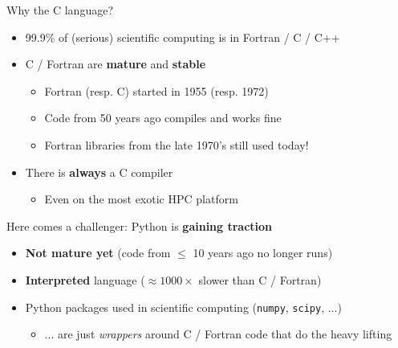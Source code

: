 \documentclass[10pt]{beamer}
\begin{document}
\begin{frame}
  \begin{block}{Why the C language?}
  \begin{itemize}
  \item 99.9\% of (serious) scientific computing is in Fortran / C / C++

    \medskip

  \item C / Fortran are \textbf{mature} and \textbf{stable}
    \begin{itemize}
    \item Fortran (resp. C) started in 1955 (resp. 1972)
    \item Code from 50 years ago compiles and works fine
    \item Fortran libraries from the late 1970's still used today!
    \end{itemize}

    \medskip

  \item There is \textbf{always} a C compiler
    \begin{itemize}
    \item Even on the most exotic HPC platform
    \end{itemize}    
  \end{itemize}
\end{block}

\begin{exampleblock}{Here comes a challenger: Python is \textbf{gaining traction}}
  \begin{itemize}
  \item \textbf{Not mature yet} (code from $\leq$ 10 years ago \alert{no longer runs})
  \item \textbf{Interpreted} language ($\approx 1000\times$ \alert{slower} than C / Fortran)
  \item Python packages used in scientific computing (\texttt{numpy}, \texttt{scipy}, ...)
    \begin{itemize}
    \item ... are just \emph{wrappers} around C / Fortran code that do the heavy lifting
    \end{itemize}
  \end{itemize}
\end{exampleblock}
\end{frame}

\end{document}
